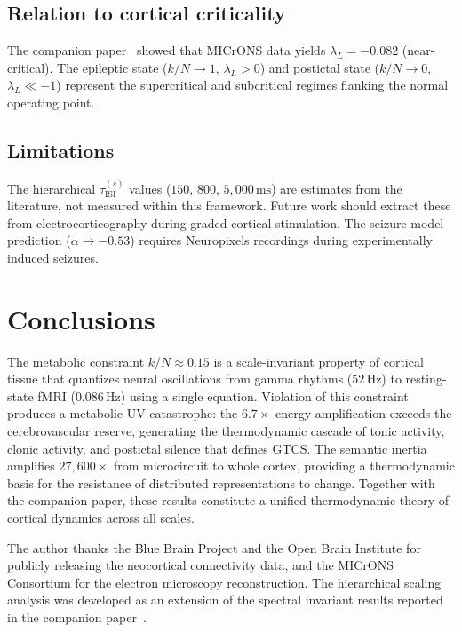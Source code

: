 \documentclass[aps,pre,twocolumn,showpacs,superscriptaddress,longbibliography]{revtex4-2}
\newcommand{\kN}{k/N}
\newcommand{\tauISI}{\tau_{\mathrm{ISI}}}
\begin{document}
\subsection{Relation to cortical criticality}

The companion paper~\cite{Santos2025a} showed that MICrONS data
yields $\lambda_L = -0.082$ (near-critical). The epileptic
state ($\kN \to 1$, $\lambda_L > 0$) and postictal state
($\kN \to 0$, $\lambda_L \ll -1$) represent the supercritical
and subcritical regimes flanking the normal operating point.

\subsection{Limitations}

The hierarchical $\tauISI^{(s)}$ values ($150$, $800$,
$5{,}000\,\mathrm{ms}$) are estimates from the literature,
not measured within this framework. Future work should extract
these from electrocorticography during graded cortical
stimulation. The seizure model prediction ($\alpha \to -0.53$)
requires Neuropixels recordings during experimentally induced
seizures.

\section{\label{sec:conclusions}Conclusions}

The metabolic constraint $\kN \approx 0.15$ is a scale-invariant
property of cortical tissue that quantizes neural oscillations
from gamma rhythms ($52\,\mathrm{Hz}$) to resting-state fMRI
($0.086\,\mathrm{Hz}$) using a single equation. Violation of
this constraint produces a metabolic UV catastrophe: the
$6.7\times$ energy amplification exceeds the cerebrovascular
reserve, generating the thermodynamic cascade of tonic activity,
clonic activity, and postictal silence that defines GTCS.
The semantic inertia amplifies $27{,}600\times$ from
microcircuit to whole cortex, providing a thermodynamic
basis for the resistance of distributed representations to
change. Together with the companion paper, these results
constitute a unified thermodynamic theory of cortical
dynamics across all scales.

\begin{acknowledgments}
The author thanks the Blue Brain Project and the Open Brain
Institute for publicly releasing the neocortical connectivity
data, and the MICrONS Consortium for the electron microscopy
reconstruction. The hierarchical scaling analysis was developed
as an extension of the spectral invariant results reported in
the companion paper~\cite{Santos2025a}.
\end{acknowledgments}
\end{document}
